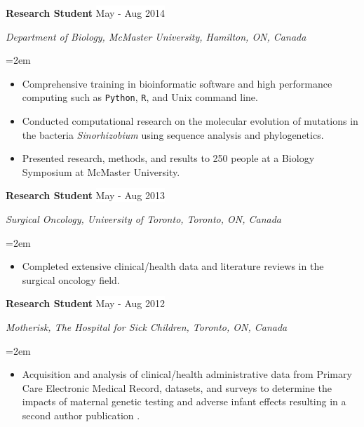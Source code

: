 \documentclass[paper=a4,fontsize=11pt]{scrartcl}	 			%
\newcommand{\NewPart}[1]{\section*{\uppercase{#1}}}
\newcommand{\EducationEntry}[4]{
		\noindent \textbf{#1} \hfill 					%
		\colorbox{White}{%
			\parbox{10em}{%
			\hfill\color{Black}#2}} \par				%
		\noindent \textit{#3} \par					%
		\noindent\hangindent=2em\hangafter=0 \small #4 	%
		\normalsize \par}
\newcommand{\WorkEntry}[4]{						%
		\noindent \textbf{#1} \hfill 					%
		\colorbox{White}{\color{Black}#2} \par		%
		\noindent \textit{#3} \par					%
		\noindent\hangindent=2em\hangafter=0 \small #4 	%
		\normalsize \par}
\newcommand{\WorkEntryF}[2]{						%
	 \textbf{#1} \hfill 					%
	\colorbox{White}{\color{Black}#2} \par}
\begin{document}
	\WorkEntry{Research Student}{May - Aug 2014}{Department of Biology, McMaster University, Hamilton, ON, Canada}{
		\begin{itemize}
		\item Comprehensive training in bioinformatic software and high performance computing such as \texttt{Python}, \texttt{R}, and Unix command line. 
		\item Conducted computational research on the molecular evolution of mutations in the bacteria \textit{Sinorhizobium} using sequence analysis and phylogenetics.
		\item Presented research, methods, and results to 250 people at a Biology Symposium at McMaster University. 
		\end{itemize}}
	\WorkEntry{Research Student}{May - Aug 2013}{Surgical Oncology, University of Toronto, Toronto, ON, Canada}{
		\begin{itemize}
			\setlength{\itemindent}{0.2in}
		\item Completed extensive clinical/health data and literature reviews in the surgical oncology field.
		\end{itemize}}
	\sloppy\WorkEntry{Research Student}{May - Aug 2012}{Motherisk, The Hospital for Sick Children, Toronto, ON, Canada}{
		\begin{itemize}
				\setlength{\itemindent}{0.2in}
		\item Acquisition and analysis of clinical/health administrative data from Primary Care Electronic Medical Record, datasets, and surveys to determine the impacts of maternal genetic testing and adverse infant effects resulting in a second author publication \cite{More:17}.
		\end{itemize}}

%
\end{document}

